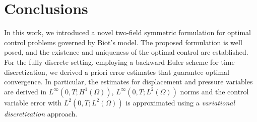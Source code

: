 \documentclass{amsart}
\begin{document}
\section{Conclusions}\label{sec:conclusions}
In this work, we introduced a novel two-field symmetric formulation for optimal control problems governed by Biot’s model. The proposed formulation is well posed, and the existence and uniqueness of the optimal control are established. For the fully discrete setting, employing a backward Euler scheme for time discretization, we derived a priori error estimates that guarantee optimal convergence. In particular, the estimates for displacement and pressure variables are derived in $L^{\infty}(0,T;H^{1}(\Omega))$, $L^{\infty}(0,T;L^2(\Omega))$ norms and the control variable error with $L^{2}(0,T;L^{2}(\Omega))$ is approximated using a \textit{variational discretization} approach.

\end{document}
